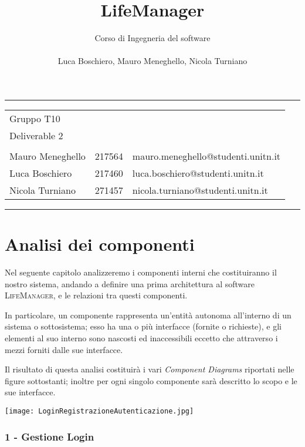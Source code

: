\documentclass[a4paper,12pt]{article}
\title{LifeManager}
\author{
 Corso di Ingegneria del software\\ \\Luca Boschiero, Mauro Meneghello, Nicola Turniano
 }
\begin{document}
 
 \maketitle
 \thispagestyle{fancy}
 \vspace{15cm}
\hrule
\begin{table}[!h] 
\begin{tabular}{l l l}
Gruppo T10\\
Deliverable 2\\
 \\
Mauro Meneghello & 217564 & mauro.meneghello@studenti.unitn.it \\
Luca Boschiero & 217460 & luca.boschiero@studenti.unitn.it \\
Nicola Turniano  & 271457 & nicola.turniano@studenti.unitn.it \\
\end{tabular}
\end{table}
\hrule



  

\newpage


\part*{Analisi dei componenti}
Nel seguente capitolo analizzeremo i componenti interni che costituiranno il nostro sistema, andando a definire una prima architettura al software {\scshape LifeManager}, e le relazioni tra questi componenti. 

In particolare, un componente rappresenta un’entità autonoma all’interno di un sistema o sottosistema; esso ha una o più interfacce (fornite o richieste), e gli elementi al suo interno sono nascosti ed inaccessibili eccetto che attraverso i mezzi forniti dalle sue interfacce.


Il risultato di questa analisi costituirà i vari \textit{Component Diagrams }riportati nelle figure sottostanti; inoltre per ogni singolo componente sarà descritto lo scopo e le sue interfacce.

\begin{center}
  \texttt{[image: LoginRegistrazioneAutenticazione.jpg]}
\end{center}

\section*{1 - Gestione Login}
\end{document}
